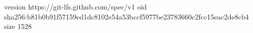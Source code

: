 version https://git-lfs.github.com/spec/v1
oid sha256:b81b0b91f57159ed1dc8102e54a53bccf5977be23783660c2fcc15eac2de8cb4
size 1528
